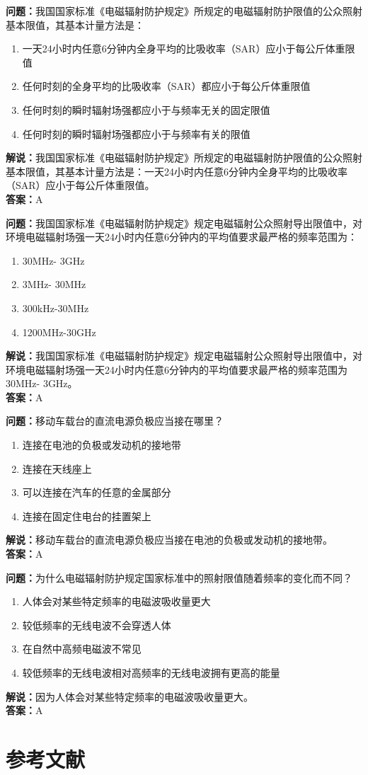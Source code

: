 \documentclass{ctexbook}%
\begin{document}
\textbf{问题：}我国国家标准《电磁辐射防护规定》所规定的电磁辐射防护限值的公众照射基本限值，其基本计量方法是：
\begin{enumerate}[label=\Alph*), leftmargin=3em]
\item 一天24小时内任意6分钟内全身平均的比吸收率（SAR）应小于每公斤体重限值
\item 任何时刻的全身平均的比吸收率（SAR）都应小于每公斤体重限值
\item 任何时刻的瞬时辐射场强都应小于与频率无关的固定限值
\item 任何时刻的瞬时辐射场强都应小于与频率有关的限值
\end{enumerate}
\textbf{解说：}我国国家标准《电磁辐射防护规定》所规定的电磁辐射防护限值的公众照射基本限值，其基本计量方法是：一天24小时内任意6分钟内全身平均的比吸收率（SAR）应小于每公斤体重限值。\\
\textbf{答案：}A

\textbf{问题：}我国国家标准《电磁辐射防护规定》规定电磁辐射公众照射导出限值中，对环境电磁辐射场强一天24小时内任意6分钟内的平均值要求最严格的频率范围为：
\begin{enumerate}[label=\Alph*), leftmargin=3em]
\item 30MHz- 3GHz
\item 3MHz- 30MHz
\item 300kHz-30MHz
\item 1200MHz-30GHz
\end{enumerate}
\textbf{解说：}我国国家标准《电磁辐射防护规定》规定电磁辐射公众照射导出限值中，对环境电磁辐射场强一天24小时内任意6分钟内的平均值要求最严格的频率范围为30MHz- 3GHz。\\
\textbf{答案：}A

\textbf{问题：}移动车载台的直流电源负极应当接在哪里？
\begin{enumerate}[label=\Alph*), leftmargin=3em]
\item 连接在电池的负极或发动机的接地带
\item 连接在天线座上
\item 可以连接在汽车的任意的金属部分
\item 连接在固定住电台的挂置架上
\end{enumerate}
\textbf{解说：}移动车载台的直流电源负极应当接在电池的负极或发动机的接地带。\\
\textbf{答案：}A

\textbf{问题：}为什么电磁辐射防护规定国家标准中的照射限值随着频率的变化而不同？
\begin{enumerate}[label=\Alph*), leftmargin=3em]
\item 人体会对某些特定频率的电磁波吸收量更大
\item 较低频率的无线电波不会穿透人体
\item 在自然中高频电磁波不常见
\item 较低频率的无线电波相对高频率的无线电波拥有更高的能量
\end{enumerate}
\textbf{解说：}因为人体会对某些特定频率的电磁波吸收量更大。\\
\textbf{答案：}A


\chapter*{参考文献}
\end{document}
